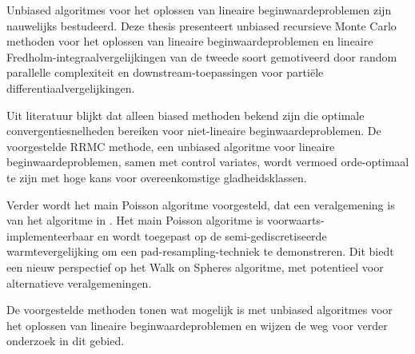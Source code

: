 Unbiased algoritmes voor het oplossen van lineaire beginwaardeproblemen zijn
nauwelijks bestudeerd.
Deze thesis presenteert unbiased recursieve Monte Carlo methoden
voor het oplossen van lineaire beginwaardeproblemen en lineaire Fredholm-integraalvergelijkingen
van de tweede soort gemotiveerd door random
parallelle complexiteit en downstream-toepassingen voor partiële differentiaalvergelijkingen.

Uit literatuur blijkt dat alleen biased methoden  bekend zijn die optimale convergentiesnelheden bereiken
voor niet-lineaire beginwaardeproblemen.
De voorgestelde RRMC methode, een unbiased algoritme voor lineaire beginwaardeproblemen,
samen met control variates, wordt vermoed orde-optimaal te zijn met hoge kans
voor overeenkomstige gladheidsklassen.

Verder wordt het main Poisson algoritme voorgesteld, dat een veralgemening is van het algoritme in \cite{acebron_monte_2016}.
Het main Poisson algoritme is voorwaarts-implementeerbaar en wordt toegepast op de semi-gediscretiseerde
warmtevergelijking om een pad-resampling-techniek te demonstreren. Dit biedt een nieuw perspectief op
het Walk on Spheres algoritme,
met potentieel voor alternatieve veralgemeningen.

De voorgestelde methoden tonen
wat mogelijk is met unbiased algoritmes voor
het oplossen van lineaire beginwaardeproblemen
en wijzen de weg voor verder onderzoek in dit gebied.